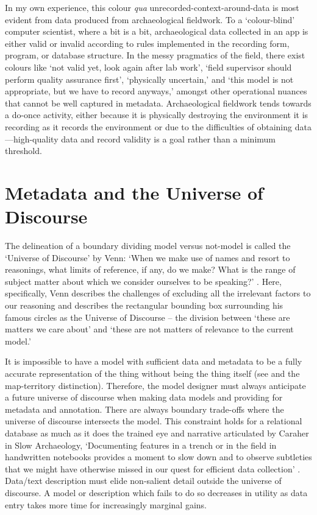 \documentclass{scrarticle}
\begin{document}
In my own experience, this colour \textit{qua} unrecorded-context-around-data is most evident from data produced from archaeological fieldwork. To a `colour-blind' computer scientist, where a bit is a bit, archaeological data collected in an app is either valid or invalid according to rules implemented in the recording form, program, or database structure. In the messy pragmatics of the field, there exist colours like `not valid yet, look again after lab work', `field supervisor should perform quality assurance first', `physically uncertain,' and `this model is not appropriate, but we have to record anyways,' amongst other operational nuances that cannot be well captured in metadata. Archaeological fieldwork tends towards a do-once activity, either because it is physically destroying the environment it is recording as it records the environment or due to the difficulties of obtaining data---high-quality data and record validity is a goal rather than a minimum threshold.

\section{Metadata and the Universe of Discourse}

The delineation of a boundary dividing model versus not-model is called the `Universe of Discourse' by Venn: `When we make use of names and resort to reasonings, what limits of reference, if any, do we make? What is the range of subject matter about which we consider ourselves to be speaking?' \parencite[180]{Venn1881-yy}. Here, specifically, Venn describes the challenges of excluding all the irrelevant factors to our reasoning and describes the rectangular bounding box surrounding his famous circles as the Universe of Discourse -- the division between `these are matters we care about' and `these are not matters of relevance to the current model.' 

It is impossible to have a model with sufficient data and metadata to be a fully accurate representation of the thing without being the thing itself (see \cite[131]{Borges1975-rn} and the map-territory distinction). Therefore, the model designer must always anticipate a future universe of discourse when making data models and providing for metadata and annotation. There are always boundary trade-offs where the universe of discourse intersects the model. This constraint holds for a relational database as much as it does the trained eye and narrative articulated by Caraher in Slow Archaeology, `Documenting features in a trench or in the field in handwritten notebooks provides a moment to slow down and to observe subtleties that we might have otherwise missed in our quest for efficient data collection' \parencite*[50]{Caraher2015-dn}. Data/text description must elide non-salient detail outside the universe of discourse. A model or description which fails to do so decreases in utility as data entry takes more time for increasingly marginal gains.
\end{document}
